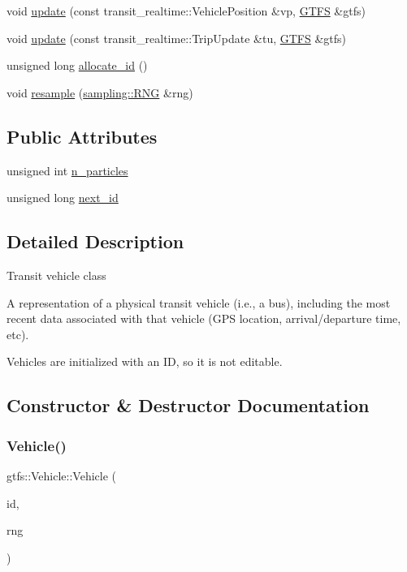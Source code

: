 \begin{DoxyCompactItemize}
void \hyperlink{classgtfs_1_1Vehicle_add9266d843398c88d3fcc22239f586a9}{update} (const transit\+\_\+realtime\+::\+Vehicle\+Position \&vp, \hyperlink{classgtfs_1_1GTFS}{G\+T\+FS} \&gtfs)
\item 
void \hyperlink{classgtfs_1_1Vehicle_ae9944f06fb0bde02f2d7c21f2dc33787}{update} (const transit\+\_\+realtime\+::\+Trip\+Update \&tu, \hyperlink{classgtfs_1_1GTFS}{G\+T\+FS} \&gtfs)
\item 
unsigned long \hyperlink{classgtfs_1_1Vehicle_aa9087e973a9821f384ec47f51bdcedc7}{allocate\+\_\+id} ()
\item 
void \hyperlink{classgtfs_1_1Vehicle_a8367fc70a64b7e596422f880dbff1193}{resample} (\hyperlink{classsampling_1_1RNG}{sampling\+::\+R\+NG} \&rng)
\end{DoxyCompactItemize}
\subsection*{Public Attributes}
\begin{DoxyCompactItemize}
\item 
unsigned int \hyperlink{classgtfs_1_1Vehicle_aa21babc8423abf92bbdf5e0748444f44}{n\+\_\+particles}
\item 
unsigned long \hyperlink{classgtfs_1_1Vehicle_aab535dd9953f9650e2adc351965779b1}{next\+\_\+id}
\end{DoxyCompactItemize}


\subsection{Detailed Description}
Transit vehicle class

A representation of a physical transit vehicle (i.\+e., a bus), including the most recent data associated with that vehicle (G\+PS location, arrival/departure time, etc).

Vehicles are initialized with an ID, so it is not editable. 

\subsection{Constructor \& Destructor Documentation}
\mbox{\label{classgtfs_1_1Vehicle_a8838934149e47eeb7160f1755012dcd4}} 
\subsubsection{\texorpdfstring{Vehicle()}{Vehicle()}\hspace{0.1cm}{\footnotesize\ttfamily [1/2]}}
{\footnotesize\ttfamily gtfs\+::\+Vehicle\+::\+Vehicle (\begin{DoxyParamCaption}\item[{std\+::string}]{id,  }\item[{\hyperlink{classsampling_1_1RNG}{sampling\+::\+R\+NG} \&}]{rng }\end{DoxyParamCaption})}

